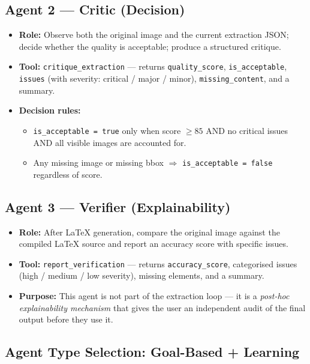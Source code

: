 \documentclass[12pt,a4paper]{article}
\begin{document}
\subsection{Agent 2 — Critic (Decision)}
\begin{itemize}[noitemsep]
  \item \textbf{Role:} Observe both the original image and the current extraction JSON; decide
    whether the quality is acceptable; produce a structured critique.
  \item \textbf{Tool:} \texttt{critique\_extraction} — returns \texttt{quality\_score},
    \texttt{is\_acceptable}, \texttt{issues} (with severity: critical / major / minor),
    \texttt{missing\_content}, and a summary.
  \item \textbf{Decision rules:}
    \begin{itemize}[noitemsep]
      \item \texttt{is\_acceptable = true} only when score $\geq 85$ AND no critical issues AND
        all visible images are accounted for.
      \item Any missing image or missing bbox $\Rightarrow$ \texttt{is\_acceptable = false}
        regardless of score.
    \end{itemize}
\end{itemize}

\subsection{Agent 3 — Verifier (Explainability)}
\begin{itemize}[noitemsep]
  \item \textbf{Role:} After LaTeX generation, compare the original image against the compiled
    LaTeX source and report an accuracy score with specific issues.
  \item \textbf{Tool:} \texttt{report\_verification} — returns \texttt{accuracy\_score},
    categorised issues (high / medium / low severity), missing elements, and a summary.
  \item \textbf{Purpose:} This agent is not part of the extraction loop — it is a
    \emph{post-hoc explainability mechanism} that gives the user an independent audit of the
    final output before they use it.
\end{itemize}

\subsection{Agent Type Selection: Goal-Based + Learning}
\end{document}

